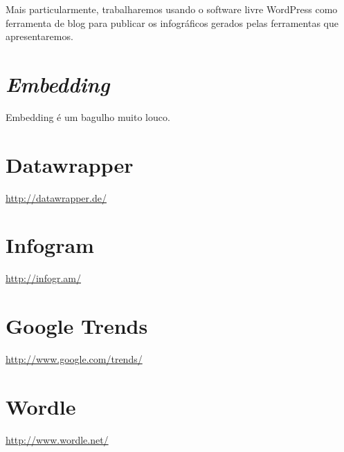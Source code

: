 \documentclass[12pt,onecolumn]{article}
\begin{document}
  Mais particularmente, trabalharemos usando o software livre WordPress como
  ferramenta de blog para publicar os infográficos gerados pelas ferramentas que
  apresentaremos.

\clearpage
\section{\textit{Embedding}}
  Embedding é um bagulho muito louco.

\clearpage
\section{Datawrapper}
  \url{http://datawrapper.de/}

\clearpage
\section{Infogram}
  \url{http://infogr.am/}

\clearpage
\section{Google Trends}
  \url{http://www.google.com/trends/}

\clearpage
\section{Wordle}
  \url{http://www.wordle.net/}
\end{document}
